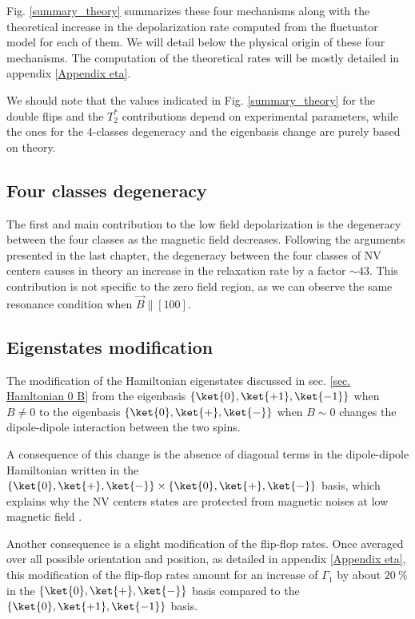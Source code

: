 \documentclass[a4paper, 11pt]{report}
\begin{document}
Fig. \ref{summary_theory} summarizes these four mechanisms along with the theoretical increase in the depolarization rate computed from the fluctuator model for each of them. We will detail below the physical origin of these four mechanisms. The computation of the theoretical rates will be mostly detailed in appendix \ref{Appendix eta}.

We should note that the values indicated in Fig. \ref{summary_theory} for the double flips and the $T_2^*$ contributions depend on experimental parameters, while the ones for the 4-classes degeneracy and the eigenbasis change are purely based on theory.

\subsection{Four classes degeneracy}

The first and main contribution to the low field depolarization is the degeneracy between the four classes as the magnetic field decreases. Following the arguments presented in the last chapter, the degeneracy between the four classes of NV centers causes in theory an increase in the relaxation rate by a factor $\sim 43$. This contribution is not specific to the zero field region, as we can observe the same resonance condition when $\vec{B} \parallel [100]$.


\subsection{Eigenstates modification}

The modification of the Hamiltonian eigenstates discussed in sec. \ref{sec. Hamltonian 0 B} from the eigenbasis $\{ \ket{0}, \ket{+1},\ket{-1} \}$ when $B\neq 0$ to the eigenbasis $\{ \ket{0}, \ket{+},\ket{-} \}$ when $B\sim 0$ changes the dipole-dipole interaction between the two spins. 

A consequence of this change is the absence of diagonal terms in the dipole-dipole Hamiltonian written in the $\{ \ket{0}, \ket{+},\ket{-} \} \times \{ \ket{0}, \ket{+},\ket{-} \}$ basis, which explains why the NV centers states are protected from magnetic noises at low magnetic field \citep{jamonneau2016competition}. 

Another consequence is a slight modification of the flip-flop rates. Once averaged over all possible orientation and position, as detailed in appendix \ref{Appendix eta}, this modification of the flip-flop rates amount for an increase of $\Gamma_1$ by about $20\ \%$ in the $\{ \ket{0}, \ket{+},\ket{-} \}$ basis compared to the $\{ \ket{0}, \ket{+1},\ket{-1} \}$ basis.
\end{document}
